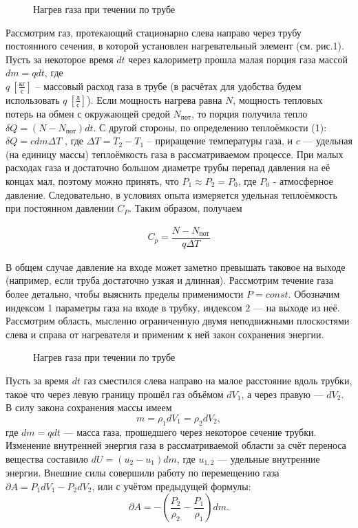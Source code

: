 \documentclass[a4paper,12pt]{article}
\begin{document}
	\begin{figure}[h!]
		\caption[]{\label{fig:1} Нагрев газа при течении по трубе}
	\end{figure}

	Рассмотрим газ, протекающий стационарно слева направо через трубу постоянного сечения, в которой установлен нагревательный элемент (см. рис.1). Пусть за некоторое время $dt$ через калориметр прошла малая порция газа массой $dm = q dt$, где\\ $q\ [\frac{кг}{с}]$ -- массовый расход газа в трубе (в расчётах для удобства будем использовать $q\ [\frac{л}{с}]$). Если мощность нагрева равна $N$, мощность тепловых потерь на обмен с окружающей средой $N_{\text{пот}}$, то порция получила тепло $\delta Q =(N - N_{\text{пот}})dt$. С другой стороны, по определению теплоёмкости (1): $\delta Q =c dm \Delta T$ , где $\Delta T = T_2 - T_1$ -- приращение температуры газа, и $c$ — удельная (на единицу массы) теплоёмкость газа в рассматриваемом процессе. При малых расходах газа и достаточно большом диаметре трубы перепад давления на её концах мал, поэтому можно принять, что $P_1 \approx P_2 = P_0$, где $P_0$ - атмосферное давление. Следовательно, в условиях опыта измеряется удельная теплоёмкость при постоянном давлении $C_P$. Таким образом, получаем
	
	\begin{equation}
		\begin{aligned}
			C_p = \dfrac{N - N_{\text{пот}}}{q \Delta T} 
		\end{aligned}
	\end{equation}

	В общем случае давление
	на входе может заметно превышать таковое на выходе
	(например, если труба достаточно узкая и длинная). Рассмотрим течение газа более
	детально, чтобы выяснить пределы применимости $P = const$. Обозначим индексом 1 параметры газа на входе в трубку, индексом 2 --- на выходе из неё. Рассмотрим область, мысленно ограниченную двумя неподвижными плоскостями слева и справа от нагревателя и применим к ней закон сохранения энергии.
	
	\begin{figure}[h!]
		\caption[]{\label{fig:2} Нагрев газа при течении по трубе}
	\end{figure}
	
	Пусть за время $dt$ газ сместился слева направо на малое расстояние вдоль
	трубки, такое что через левую границу прошёл газ объёмом $dV_1$, а через правую --- $dV_2$. В силу закона сохранения массы имеем
	\[
	m = \rho_1 dV_1 = \rho_2 d V_2,
	\]
	где $dm = q dt$ --- масса газа, прошедшего через некоторое сечение трубки.
	Изменение внутренней энергия газа в рассматриваемой области за счёт переноса вещества составило $dU = (u_2 - u_1)dm$, где $u_{1, 2}$ --- удельные внутренние энергии. Внешние силы совершили работу по перемещению газа $\partial A = P_1 dV_1 - P_2 dV_2$, или с учётом предыдущей формулы:
	\[
	\partial A = - (\frac{P_2}{\rho_2} - \frac{P_1}{\rho_1})dm.
	\]
 
\end{document}

